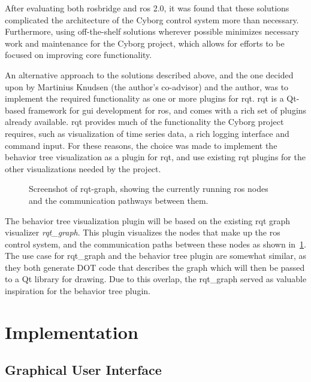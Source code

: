 \documentclass[\rootfolder/main.tex]{subfiles}
\begin{document}
After evaluating both rosbridge and \acrshort{ros} 2.0, it was found that these solutions complicated the architecture of the Cyborg control system more than necessary.
Furthermore, using off-the-shelf solutions wherever possible minimizes necessary work and maintenance for the Cyborg project, which allows for efforts to be focused on improving core functionality.

An alternative approach to the solutions described above, and the one decided upon by Martinius Knudsen (the author's co-advisor) and the author, was to implement the required functionality as one or more plugins for rqt.
rqt is a Qt-based framework for \acrfull{gui} development for \acrshort{ros}, and comes with a rich set of plugins already available.
rqt provides much of the functionality the Cyborg project requires, such as visualization of time series data, a rich logging interface and command input.
For these reasons, the choice was made to implement the behavior tree visualization as a plugin for rqt, and use existing rqt plugins for the other visualizations needed by the project.

\begin{figure}[ht]
    \caption{Screenshot of rqt-graph, showing the currently running \acrshort{ros} nodes and the communication pathways between them.}
    \label{fig:rqt-graph}
\end{figure}

The behavior tree visualization plugin will be based on the existing rqt graph visualizer \emph{rqt\_graph}.
This plugin visualizes the nodes that make up the \acrshort{ros} control system, and the communication paths between these nodes as shown in~\cref{fig:rqt-graph}.
The use case for rqt\_graph and the behavior tree plugin are somewhat similar, as they both generate DOT code that describes the graph which will then be passed to a Qt library for drawing.
Due to this overlap, the rqt\_graph served as valuable inspiration for the behavior tree plugin.


\section{Implementation}

\subsection{Graphical User Interface}
\end{document}
